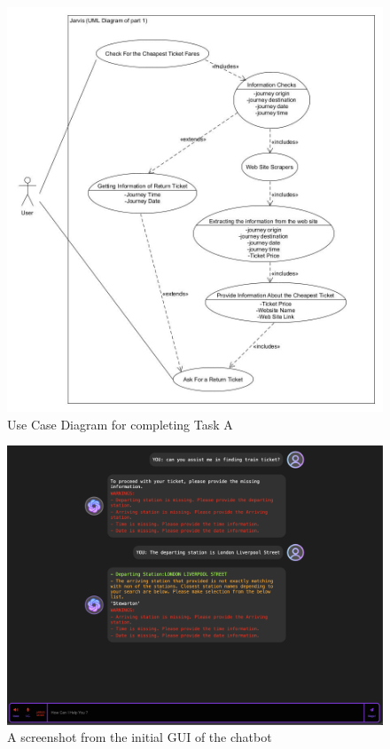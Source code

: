 \begin{figure}[!htbp]
    \centering
    \includegraphics[width=1.0\linewidth]{Diagrams/ChatBot_UML_part_1.jpg}
    \caption{Use Case Diagram for completing Task A}
    \label{Fig: User-case Diagram}
\end{figure}
\begin{figure}[!htbp]
    \centering
    \includegraphics[width=\textwidth]{Diagrams/Example_of_GUI.png}
    \caption{A screenshot from the initial GUI of the chatbot}
    \label{Fig: GUI Example}
\end{figure}
